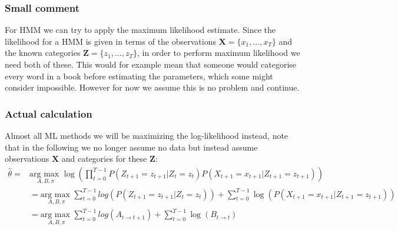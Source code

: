\subsubsection{Small comment}
For HMM we can try to apply the maximum likelihood estimate. Since the likelihood for a HMM is given in terms of the observations $\textbf{X}=\{x_1,...,x_T\}$ and the known categories $\textbf{Z}=\{z_1,...,z_T\}$, in order to perform maximum likelihood we need both of these. This would for example mean that someone would categorise every word in a book before estimating the parameters, which some might consider impossible. However for now we assume this is no problem and continue.
	
\subsubsection{Actual calculation}
Almost all ML methods we will be maximizing the log-likelihood instead, note that in the following we no longer assume no data but instead assume observations $\textbf{X}$ and categories for these $\textbf{Z}$:
\begin{equation}
	\begin{split}
	\hat{\theta} = &\underset{A,B,\pi}{\text{arg max }}\log(\prod_{t=0}^{T-1}P(Z_{t+1} = z_{t+1}|Z_t=z_t)P(X_{t+1}=x_{t+1}|Z_{t+1}=z_{t+1}))\\
	&= \underset{A,B,\pi}{\text{arg max }} \sum_{t=0}^{T-1} log(P(Z_{t+1} = z_{t+1}|Z_t=z_t)) + \sum_{t=0}^{T-1} \log(P(X_{t+1}=x_{t+1}|Z_{t+1}=z_{t+1}))\\
	&=\underset{A,B,\pi}{\text{arg max }} \sum_{t=0}^{T-1} log(A_{t\rightarrow t+1}) + \sum_{t=0}^{T-1} \log(B_{t\rightarrow t})\\
	\end{split}		
\end{equation}
	
